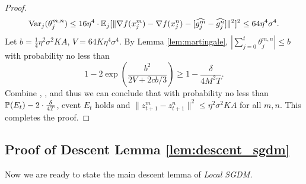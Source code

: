 \documentclass{article} %
\numberwithin{equation}{section}
\newcommand{\cirone}{\text{\ding{172}}}
\newcommand{\cirtwo}{\text{\ding{173}}}
\newcommand{\cirthree}{\text{\ding{174}}}
\begin{document}
\begin{proof}
    \begin{equation}
        \mathrm{Var}_j(\theta_j^{m,n}) \leq 16\eta^4\cdot \mathbb{E}_j[\|\nabla f(x_j^m)-\nabla f(x_j^n)-[\widehat{g_j^m} - \widehat{g_j^n}]\|^2]^2 \leq 64\eta^4\sigma^4.
    \end{equation}
    Let $b=\frac{1}{4}\eta^2\sigma^2KA$, $V=64K\eta^4\sigma^4$.
    By Lemma \ref{lem:martingale}, $|\sum_{j=0}^t\theta_j^{m,n}|\leq b$ with probability no less than
    \begin{equation}
        1-2\exp\left(\frac{b^2}{2V+2cb/3}\right)\geq 1-\frac{\delta}{4M^2T}.
    \end{equation}
    Combine \cirone, \cirtwo, \cirthree and thus we can conclude that with probability no less than $\mathbb{P}(E_t)-2\cdot\frac{\delta}{4T}$, event $E_t$ holds and $\|z_{t+1}^m-z_{t+1}^n\|^2\leq \eta^2\sigma^2KA$ for all $m,n$.
    This completes the proof.
\end{proof}

\subsection{Proof of Descent Lemma \ref{lem:descent_sgdm}}

    Now we are ready to state the main descent lemma of \em Local \em SGDM.

\end{document}
